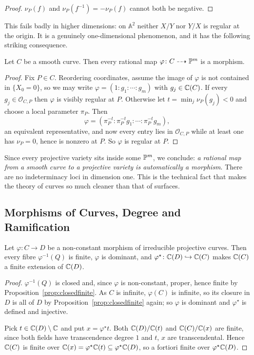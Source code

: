 \documentclass[a4paper]{scrartcl}
\newcommand{\A}{\mathbb{A}}
\newcommand{\Oh}{\mathcal{O}}
\newcommand{\dto}{\dashrightarrow}
\begin{document}
\begin{proof}
	$\nu_P(f)$ and $\nu_P(f^{-1}) = -\nu_P(f)$ cannot both be negative.
\end{proof}

This fails badly in higher dimensions: on $\A^2$ neither $X/Y$ nor $Y/X$ is regular at the origin. It is a genuinely one-dimensional phenomenon, and it has the following striking consequence.

\begin{corollary}\label{cor:ratismorph}
	Let $C$ be a smooth curve. Then every rational map $\varphi \colon C \dto \PP^m$ is a morphism.
\end{corollary}

\begin{proof}
	Fix $P \in C$. Reordering coordinates, assume the image of $\varphi$ is not contained in $\{X_0 = 0\}$, so we may write $\varphi = (1 : g_1 : \cdots : g_m)$ with $g_j \in \mathbb{C}(C)$. If every $g_j \in \Oh_{C,P}$ then $\varphi$ is visibly regular at $P$. Otherwise let $t = \min_j \nu_P(g_j) < 0$ and choose a local parameter $\pi_P$. Then
	$$\varphi = \left(\pi_P^{-t} : \pi_P^{-t}g_1 : \cdots : \pi_P^{-t}g_m\right),$$
	an equivalent representative, and now every entry lies in $\Oh_{C,P}$ while at least one has $\nu_P = 0$, hence is nonzero at $P$. So $\varphi$ is regular at $P$.
\end{proof}

Since every projective variety sits inside some $\mathbb{P}^m$, we conclude: \emph{a rational map from a smooth curve to a projective variety is automatically a morphism}. There are no indeterminacy loci in dimension one. This is the technical fact that makes the theory of curves so much cleaner than that of surfaces.

\subsection{Morphisms of Curves, Degree and Ramification}

\begin{proposition}\label{prop:degfinite}
	Let $\varphi \colon C \to D$ be a non-constant morphism of irreducible projective curves. Then every fibre $\varphi^{-1}(Q)$ is finite, $\varphi$ is dominant, and $\varphi^\star \colon \mathbb{C}(D)\hookrightarrow\mathbb{C}(C)$ makes $\mathbb{C}(C)$ a finite extension of $\mathbb{C}(D)$.
\end{proposition}

\begin{proof}
	$\varphi^{-1}(Q)$ is closed and, since $\varphi$ is non-constant, proper, hence finite by Proposition~\ref{prop:closedfinite}. As $C$ is infinite, $\varphi(C)$ is infinite, so its closure in $D$ is all of $D$ by Proposition~\ref{prop:closedfinite} again; so $\varphi$ is dominant and $\varphi^\star$ is defined and injective.

	Pick $t \in \mathbb{C}(D)\setminus\mathbb{C}$ and put $x = \varphi^\star t$. Both $\mathbb{C}(D)/\mathbb{C}(t)$ and $\mathbb{C}(C)/\mathbb{C}(x)$ are finite, since both fields have transcendence degree $1$ and $t$, $x$ are transcendental. Hence $\mathbb{C}(C)$ is finite over $\mathbb{C}(x) = \varphi^\star\mathbb{C}(t) \subseteq \varphi^\star\mathbb{C}(D)$, so a fortiori finite over $\varphi^\star \mathbb{C}(D)$.
\end{proof}
\end{document}
